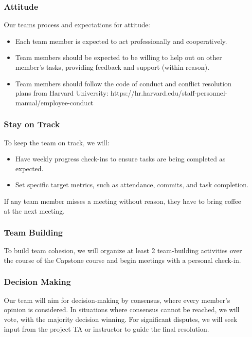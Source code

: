 \documentclass{article}
\begin{document}
\subsubsection*{Attitude}

Our teams process and expectations for attitude:
\begin{itemize}
    \item Each team member is expected to act professionally and cooperatively.
    \item Team members should be expected to be willing to help out on other member's tasks, providing feedback and support (within reason).
    \item Team members should follow the code of conduct and conflict resolution plans from Harvard University:  https://hr.harvard.edu/staff-personnel-manual/employee-conduct
\end{itemize}


\subsubsection*{Stay on Track}

To keep the team on track, we will:
\begin{itemize}
    \item Have weekly progress check-ins to ensure tasks are being completed as expected.
    \item Set specific target metrics, such as attendance, commits, and task completion. 
\end{itemize}

If any team member misses a meeting without reason, they have to bring coffee at the next meeting.

\subsubsection*{Team Building}

To build team cohesion, we will organize at least 2 team-building activities over the course of the Capstone course and begin meetings with a personal check-in.

\subsubsection*{Decision Making} 

Our team will aim for decision-making by consensus, where every member's opinion is considered. In situations where consensus cannot be reached, we will vote, with the majority decision winning. For significant disputes, we will seek input from the project TA or instructor to guide the final resolution.
\end{document}
